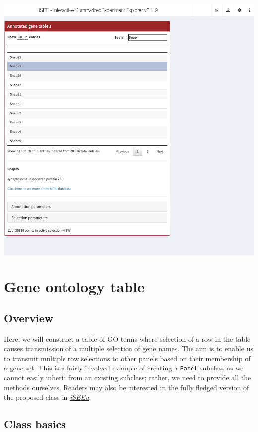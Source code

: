 \documentclass[
]{book}
\begin{document}
\includegraphics[width=1\linewidth]{screenshots/anno-table}

\hypertarget{gene-ontology-table}{%
\chapter{Gene ontology table}\label{gene-ontology-table}}

\hypertarget{overview}{%
\section{Overview}\label{overview}}

Here, we will construct a table of GO terms where selection of a row in the table
causes transmission of a multiple selection of gene names.
The aim is to enable us to transmit multiple row selections to other panels based on their membership of a gene set.
This is a fairly involved example of creating a \texttt{Panel} subclass as we cannot easily inherit from an existing subclass; rather, we need to provide all the methods ourselves.
Readers may also be interested in the fully fledged version of the proposed class in \emph{\href{https://bioconductor.org/packages/3.11/iSEEu}{iSEEu}}.

\hypertarget{class-basics}{%
\section{Class basics}\label{class-basics}}
\end{document}
